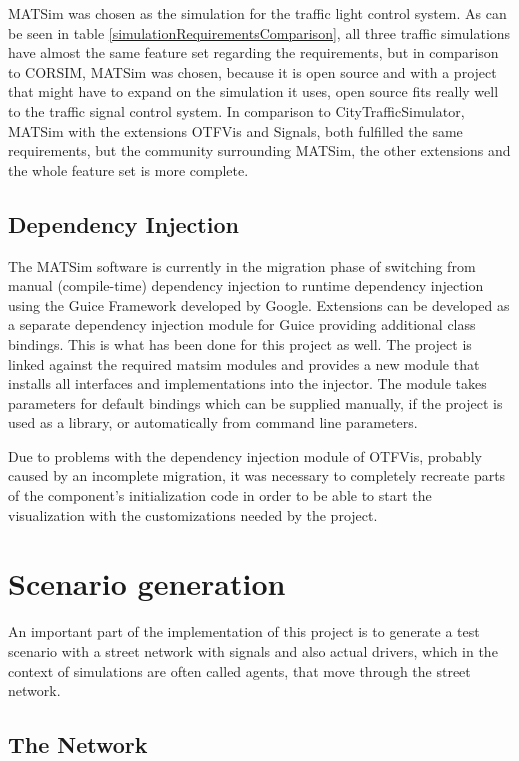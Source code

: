 MATSim was chosen as the simulation for the traffic light control system. As can be seen in table \ref{simulationRequirementsComparison}, all three traffic simulations have almost the same feature set regarding the requirements, but in comparison to CORSIM, MATSim was chosen, because it is open source and with a project that might have to expand on the simulation it uses, open source fits really well to the traffic signal control system. In comparison to CityTrafficSimulator, MATSim with the extensions OTFVis and Signals, both fulfilled the same requirements, but the community surrounding MATSim, the other extensions and the whole feature set is more complete.

\subsection*{Dependency Injection}

The MATSim software is currently in the migration phase of switching from manual (compile-time) dependency injection to runtime dependency injection using the Guice Framework developed by Google. Extensions can be developed as a separate dependency injection module for Guice providing additional class bindings. This is what has been done for this project as well. The project is linked against the required matsim modules and provides a new module that installs all interfaces and implementations into the injector. The module takes parameters for default bindings which can be supplied manually, if the project is used as a library, or automatically from command line parameters.

Due to problems with the dependency injection module of OTFVis, probably caused by an incomplete migration, it was necessary to completely recreate parts of the component's initialization code in order to be able to start the visualization with the customizations needed by the project.

\section{Scenario generation}
\label{scenario_generation}

An important part of the implementation of this project is to generate a test scenario with a street network with signals and also actual drivers, which in the context of simulations are often called agents, that move through the street network.

\subsection*{The Network}

